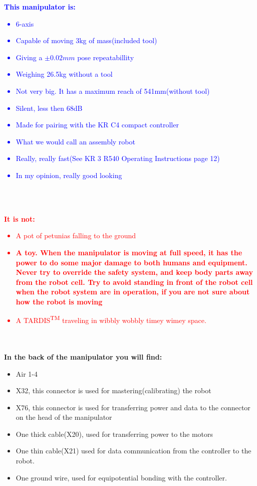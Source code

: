 \documentclass{article}
\begin{document}
   
    \newpage
    \textcolor{blue}{\textbf{This manipulator is:}
    \begin{itemize}
        \item 6-axis
        \item Capable of moving 3kg of mass(included tool)
        \item Giving a $\pm 0.02mm$ pose repeatabillity
        \item Weighing 26.5kg without a tool
        \item Not very big. It has a maximum reach of 541mm(without tool)
        \item Silent, less then 68dB
        \item Made for pairing with the KR C4 compact controller
        \item What we would call an assembly robot
        \item Really, really fast(See KR 3 R540 Operating Instructions page 12)
        \item In my opinion, really good looking
    \end{itemize}}
    \\\\
    \textcolor{red}{\textbf{It is not:}
    \begin{itemize}
        \item A pot of petunias falling to the ground
        \item \textbf{A toy. When the manipulator is moving at full speed, it has the power to do some major damage to both humans and equipment. Never try to override the safety system, and keep body parts away from the robot cell. Try to avoid standing in front of the robot cell when the robot system are in operation, if you are not sure about how the robot is moving}
         \item A TARDIS\textsuperscript{TM} traveling in wibbly wobbly          timey wimey space. 
    \end{itemize}}
    \\\\
     \textbf{In the back of the manipulator you will find:}
    \begin{itemize}
        \item Air 1-4
        \item X32, this connector is used for mastering(calibrating) the robot
        \item X76, this connector is used for transferring power and data to the connector on the head of the manipulator
        \item One thick cable(X20), used for transferring power to the motors
        \item One thin cable(X21) used for data communication from the controller to the robot. 
        \item One ground wire, used for equipotential bonding with the controller. 
    \end{itemize}
    
\end{document}
